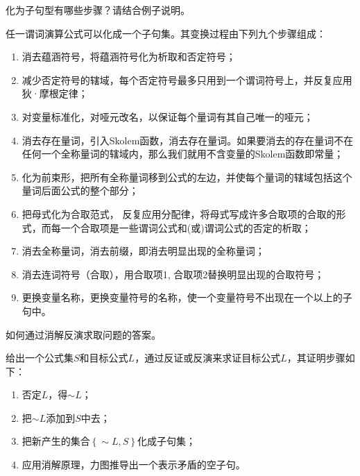 \begin{question}
化为子句型有哪些步骤？请结合例子说明。
\end{question}	
\begin{solution}
任一谓词演算公式可以化成一个子句集。其变换过程由下列九个步骤组成：
	\begin{enumerate}
		\item 消去蕴涵符号，将蕴涵符号化为析取和否定符号；
		\item 减少否定符号的辖域，每个否定符号最多只用到一个谓词符号上，并反复应用狄·摩根定律；
		\item 对变量标准化，对哑元改名，以保证每个量词有其自己唯一的哑元；
		\item 消去存在量词，引入Skolem函数，消去存在量词。如果要消去的存在量词不在任何一个全称量词的辖域内，那么我们就用不含变量的Skolem函数即常量；
		\item 化为前束形，把所有全称量词移到公式的左边，并使每个量词的辖域包括这个量词后面公式的整个部分；
		\item 把母式化为合取范式， 反复应用分配律，将母式写成许多合取项的合取的形式，而每一个合取项是一些谓词公式和(或)谓词公式的否定的析取；
		\item 消去全称量词，消去前缀，即消去明显出现的全称量词；
		\item 消去连词符号（合取），用{合取项1, 合取项2}替换明显出现的合取符号；
		\item 更换变量名称，更换变量符号的名称，使一个变量符号不出现在一个以上的子句中。
	\end{enumerate}
\end{solution}

\begin{question}
如何通过消解反演求取问题的答案。
\end{question}	
\begin{solution}
给出一个公式集$S$和目标公式$L$，通过反证或反演来求证目标公式$L$，其证明步骤如下： 
	\begin{enumerate}
		\item 否定$L$，得$\sim L$； 
		\item 把$\sim L$添加到$S$中去； 
		\item 把新产生的集合$\left\{\sim L, S\right\}$化成子句集； 
		\item 应用消解原理，力图推导出一个表示矛盾的空子句。
	\end{enumerate}
\end{solution}

